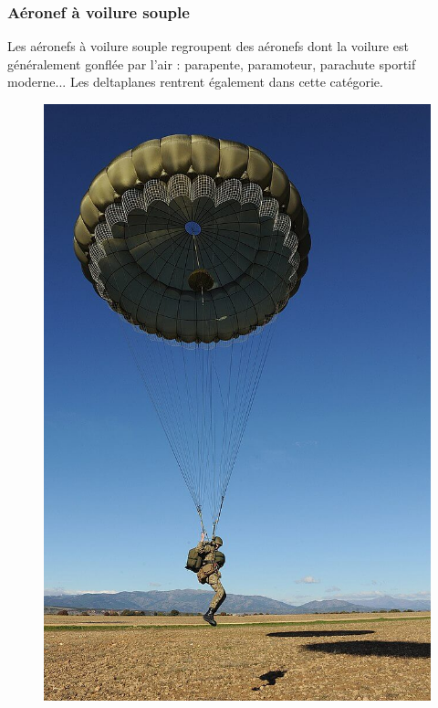 	\subsubsection{Aéronef à voilure souple}
	Les aéronefs à voilure souple  regroupent des aéronefs dont la voilure est généralement gonflée par l'air : parapente, paramoteur, parachute sportif moderne... Les deltaplanes rentrent également dans cette catégorie.
	
	
	\begin{figure}[H]
	\begin{minipage}[c]{0.35\linewidth}
	\includegraphics[width=\linewidth]{01-EtudeAeronefs/img/paraMili.jpg}

\end{minipage}
\end{figure}
